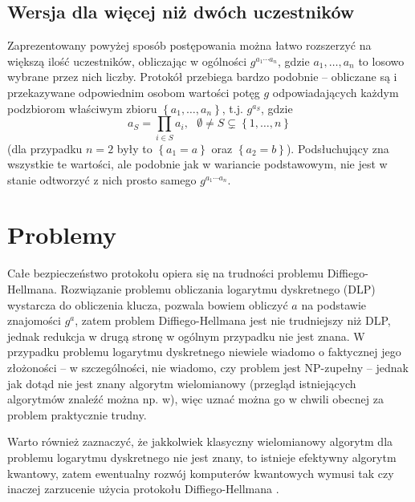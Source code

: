 \documentclass[10pt]{article}
\begin{document}
\subsection{Wersja dla więcej niż dwóch uczestników}

Zaprezentowany powyżej sposób postępowania można łatwo rozszerzyć na większą ilość uczestników,
obliczając w ogólności \(g^{a_1 \cdots a_n}\), gdzie \(a_1,\ldots,a_n\) to losowo wybrane przez nich
liczby. Protokół przebiega bardzo podobnie -- obliczane są i przekazywane odpowiednim osobom
wartości potęg \(g\) odpowiadających każdym podzbiorom właściwym zbioru 
\(\left\{a_1,\ldots,a_n\right\}\), t.j. \(g^{a_S}\), gdzie
\[
a_S = \prod_{i\in S}a_i,\ \ \ 
\emptyset\neq S\varsubsetneq \left\{1,\ldots,n\right\}
\]
(dla przypadku \(n=2\) były to \(\left\{a_1=a\right\}\) oraz
\(\left\{a_2=b\right\}\)). Podsłuchujący zna wszystkie te wartości, ale podobnie jak w wariancie
podstawowym, nie jest w stanie odtworzyć z nich prosto samego \(g^{a_1 \cdots a_n}\).

\section{Problemy}

Całe bezpieczeństwo protokołu opiera się na trudności problemu Diffiego-Hellmana. Rozwiązanie 
problemu obliczania logarytmu dyskretnego (DLP) wystarcza do obliczenia klucza, pozwala 
bowiem obliczyć \(a\) na podstawie znajomości \(g^a\), zatem problem Diffiego-Hellmana jest nie 
trudniejszy niż DLP, jednak redukcja w drugą stronę w ogólnym przypadku nie jest znana\footnotemark.
W przypadku problemu logarytmu dyskretnego niewiele wiadomo o faktycznej jego złożoności -- w
szczególności, nie wiadomo, czy problem jest NP-zupełny -- jednak jak dotąd nie jest znany algorytm
wielomianowy (przegląd istniejących algorytmów znaleźć można np. w\cite{Sutherland07}), więc uznać
można go w chwili obecnej za problem praktycznie trudny.


Warto również zaznaczyć, że jakkolwiek klasyczny wielomianowy algorytm dla problemu logarytmu 
dyskretnego nie jest znany, to istnieje efektywny algorytm kwantowy\cite{Shor97}, zatem ewentualny 
rozwój komputerów kwantowych wymusi tak czy inaczej zarzucenie użycia protokołu Diffiego-Hellmana
\footnotemark.
\end{document}
